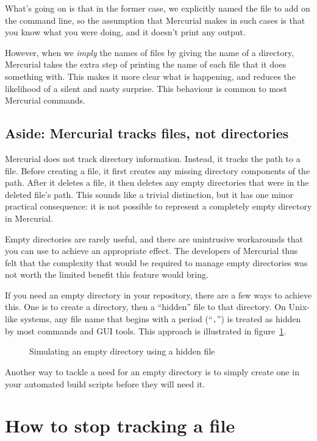 What's going on is that in the former case, we explicitly named the
file to add on the command line, so the assumption that Mercurial
makes in such cases is that you know what you were doing, and it
doesn't print any output.

However, when we \emph{imply} the names of files by giving the name of
a directory, Mercurial takes the extra step of printing the name of
each file that it does something with.  This makes it more clear what
is happening, and reduces the likelihood of a silent and nasty
surprise.  This behaviour is common to most Mercurial commands.

\subsection{Aside: Mercurial tracks files, not directories}

Mercurial does not track directory information.  Instead, it tracks
the path to a file.  Before creating a file, it first creates any
missing directory components of the path.  After it deletes a file, it
then deletes any empty directories that were in the deleted file's
path.  This sounds like a trivial distinction, but it has one minor
practical consequence: it is not possible to represent a completely
empty directory in Mercurial.

Empty directories are rarely useful, and there are unintrusive
workarounds that you can use to achieve an appropriate effect.  The
developers of Mercurial thus felt that the complexity that would be
required to manage empty directories was not worth the limited benefit
this feature would bring.

If you need an empty directory in your repository, there are a few
ways to achieve this. One is to create a directory, then  a
``hidden'' file to that directory.  On Unix-like systems, any file
name that begins with a period (``\texttt{.}'') is treated as hidden
by most commands and GUI tools.  This approach is illustrated in
figure~\ref{ex:daily:hidden}.

\begin{figure}[ht]
  \caption{Simulating an empty directory using a hidden file}
  \label{ex:daily:hidden}
\end{figure}

Another way to tackle a need for an empty directory is to simply
create one in your automated build scripts before they will need it.

\section{How to stop tracking a file}

